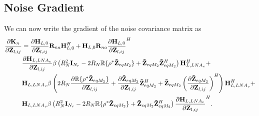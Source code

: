 \subsection{Noise Gradient}
We can now write the gradient of the noise covariance matrix as
\begin{align}
\label{eq:noise_grad}\nonumber
\frac{\partial\mat{K}_n}{\partial\mat{Z}_{l,ij}} &= 
\frac{\partial\mat{H}_{L,0}}{\partial\mat{Z}_{l,ij}}\mat{R}_{na}\mat{H}_{L,0}^H +\mat{H}_{L,0}\mat{R}_{na} \frac{\partial\mat{H}_{L,0}}{\partial\mat{Z}_{l,ij}}^H
\\\nonumber
&\frac{\partial\mat{H}_{L,LNA_v}}{\partial\mat{Z}_{l,ij}}\beta\left(R_N^2\mat{I}_{N_r} - 2 R_N\mathbb{R}\{\rho^*\mat{\tilde{Z}}_{eqM_2}\} + \mat{\tilde{Z}}_{eqM_2}\mat{\tilde{Z}}_{eqM_2}^H\right)\mat{H}_{L,LNA_v}^H+
\\\nonumber
&\mat{H}_{L,LNA_v}\beta\left(2 R_N\frac{\partial\mathbb{R}\{\rho^*\mat{\tilde{Z}}_{eqM_2}\}}{\partial\mat{Z}_{l,ij}} +
\frac{\partial\mat{\tilde{Z}}_{eqM_2}}{\partial\mat{Z}_{l,ij}}\mat{\tilde{Z}}_{eqM_2}^H + \mat{\tilde{Z}}_{eqM_2}\left(\frac{\partial\mat{\tilde{Z}}_{eqM_2}}{\partial\mat{Z}_{l,ij}}\right)^H\right)\mat{H}_{L,LNA_v}^H+\\
&\mat{H}_{L,LNA_v}\beta\left(R_N^2\mat{I}_{N_r} - 2 R_N\mathbb{R}\{\rho^*\mat{\tilde{Z}}_{eqM_2}\} + \mat{\tilde{Z}}_{eqM_2}\mat{\tilde{Z}}_{eqM_2}^H\right)\frac{\partial\mat{H}_{L,LNA_v}}{\partial\mat{Z}_{l,ij}}^H.%
\end{align}

